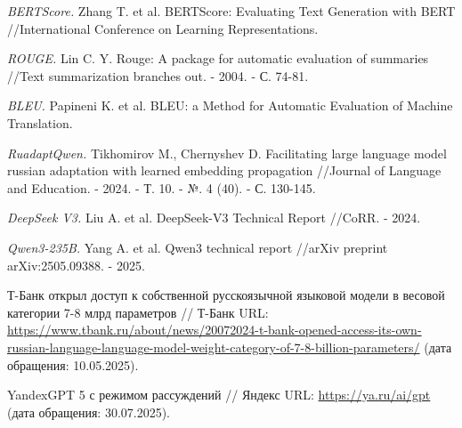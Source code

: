 \documentclass{article}
\begin{document}
\begin{thebibliography}{99}
\textit{BERTScore.}
Zhang T. et al. BERTScore: Evaluating Text Generation with BERT //International Conference on Learning Representations.

\textit{ROUGE.}
Lin C. Y. Rouge: A package for automatic evaluation of summaries //Text summarization branches out. - 2004. - С. 74-81.

\textit{BLEU.}
Papineni K. et al. BLEU: a Method for Automatic Evaluation of Machine Translation.

\textit{RuadaptQwen.}
Tikhomirov M., Chernyshev D. Facilitating large language model russian adaptation with learned embedding propagation //Journal of Language and Education. - 2024. - Т. 10. - №. 4 (40). - С. 130-145.

\textit{DeepSeek V3.}
Liu A. et al. DeepSeek-V3 Technical Report //CoRR. - 2024.

\textit{Qwen3-\allowbreak 235B.}
Yang A. et al. Qwen3 technical report //arXiv preprint arXiv:2505.09388. - 2025.

Т-Банк открыл доступ к собственной русскоязычной языковой модели в весовой категории 7-8 млрд параметров // Т-Банк URL: \url{https://www.tbank.ru/about/news/20072024-t-bank-opened-access-its-own-russian-language-language-model-weight-category-of-7-8-billion-parameters/} (дата обращения: 10.05.2025).

YandexGPT 5 с режимом рассуждений // Яндекс URL: \url{https://ya.ru/ai/gpt} (дата обращения: 30.07.2025).

\end{thebibliography}
\end{document}
